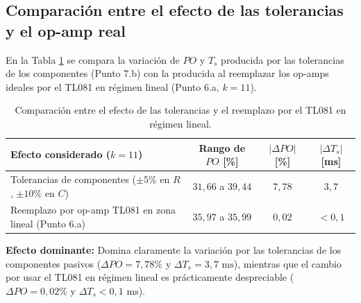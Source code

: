 \documentclass[11pt,a4paper]{article}
\begin{document}
\subsection{Comparación entre el efecto de las tolerancias y el op-amp real}
En la Tabla \ref{tab:punto7c} se compara la variación de $PO$ y $T_s$ producida por las tolerancias de los componentes (Punto 7.b) con la producida al reemplazar los op-amps ideales por el TL081 en régimen lineal (Punto 6.a, $k = 11$).

\begin{table}[H]
    \centering
    \small
    \begin{tabular}{l c c c}
        \toprule
        \textbf{Efecto considerado ($k = 11$)} & \textbf{Rango de $PO$ [\%]} & \textbf{$|\Delta PO|$ [\%]} & \textbf{$|\Delta T_s|$ [ms]} \\
        \midrule
        Tolerancias de componentes ($\pm 5\%$ en $R$, $\pm 10\%$ en $C$) & $31,66$ a $39,44$ & $7,78$ & $3,7$ \\
        Reemplazo por op-amp TL081 en zona lineal (Punto 6.a)            & $35,97$ a $35,99$ & $0,02$ & $< 0,1$ \\
        \bottomrule
    \end{tabular}
    \caption{Comparación entre el efecto de las tolerancias y el reemplazo por el TL081 en régimen lineal.}
    \label{tab:punto7c}
\end{table}

\textbf{Efecto dominante:} Domina claramente la variación por las tolerancias de los componentes pasivos ($\Delta PO = 7,78\%$ y $\Delta T_s = 3,7\text{ ms}$), mientras que el cambio por usar el TL081 en régimen lineal es prácticamente despreciable ($\Delta PO = 0,02\%$ y $\Delta T_s < 0,1\text{ ms}$).
\end{document}
